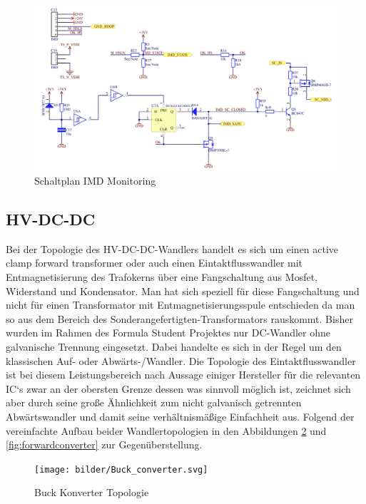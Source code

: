 \begin{figure}
	\centering
	\includegraphics[width=0.9\linewidth]{"bilder/IMD Monitoring schematic"}
	\caption{Schaltplan IMD Monitoring}
	\label{fig:imd-monitoring-schematic}
\end{figure}

\FloatBarrier
\subsection{\ac{HV}-\ac{DC}-\ac{DC}}
Bei der Topologie des \ac{HV}-\ac{DC}-\ac{DC}-Wandlers handelt es sich um einen active clamp forward transformer oder auch einen Eintaktflusswandler mit Entmagnetisierung des Trafokerns über eine Fangschaltung aus Mosfet, Widerstand und Kondensator. Man hat sich speziell für diese Fangschaltung und nicht für einen Transformator mit Entmagnetisierungsspule entschieden da man so aus dem Bereich des Sonderangefertigten-Transformators rauskommt. Bisher wurden im Rahmen des Formula Student Projektes nur \ac{DC}-Wandler ohne galvanische Trennung eingesetzt. Dabei handelte es sich in der Regel um den klassischen Auf- oder Abwärts-/Wandler. Die Topologie des Eintaktflusswandler ist bei diesem Leistungsbereich nach Aussage einiger Hersteller für die relevanten \ac{IC}`s zwar an der obersten Grenze dessen was sinnvoll möglich ist, zeichnet sich aber durch seine große Ähnlichkeit zum nicht galvanisch getrennten Abwärtswandler und damit seine verhältnismäßige Einfachheit aus. Folgend der vereinfachte Aufbau beider Wandlertopologien in den Abbildungen \ref{fig:buckconverter} und \ref{fig:forwardconverter} zur Gegenüberstellung.

\begin{figure}
	\centering
	\texttt{[image: bilder/Buck\_converter.svg]}
	\caption{Buck Konverter Topologie \cite{WikiWandlertopo}}
	\label{fig:buckconverter}
\end{figure}

